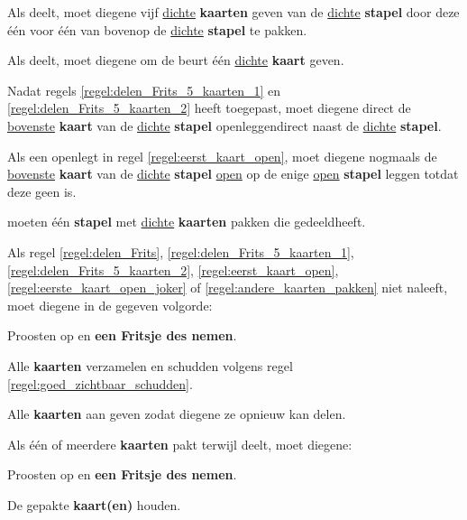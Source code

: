 \vervolgLijst{}
\item Als \Frits deelt\footnotemark[1], moet diegene \alleSpelers vijf \ul{dichte} \textbf{kaarten} geven van de \ul{dichte} \textbf{stapel} door deze één voor één van bovenop de \ul{dichte} \textbf{stapel} te pakken.
\label{regel:delen_Frits_5_kaarten_1}
\eindLijst{}

\vervolgLijst{}
\item Als \Frits deelt\footnotemark[1], moet diegene \alleSpelers om de beurt één \ul{dichte} \textbf{kaart} geven.
\label{regel:delen_Frits_5_kaarten_2}
\eindLijst{}

\vervolgLijst{}
\item Nadat \Frits regels \ref{regel:delen_Frits_5_kaarten_1} en \ref{regel:delen_Frits_5_kaarten_2} heeft toegepast, moet diegene direct de \ul{bovenste} \textbf{kaart} van de \ul{dichte} \textbf{stapel} openleggen\footnotemark[2] direct naast de \ul{dichte} \textbf{stapel}.
\label{regel:eerst_kaart_open}
\eindLijst{}

\vervolgLijst{}
\item Als \Frits een \footnotemark[3] openlegt in regel \ref{regel:eerst_kaart_open}, moet diegene nogmaals de \ul{bovenste} \textbf{kaart} van de \ul{dichte} \textbf{stapel} \ul{open} op de enige \ul{open} \textbf{stapel} leggen totdat deze geen \footnotemark[3] is.
\label{regel:eerste_kaart_open_joker}
\eindLijst{}

\vervolgLijst{}
\item \AlleSpelers moeten \'e\'en \textbf{stapel} met \ul{dichte} \textbf{kaarten} pakken die \Frits gedeeld\footnotemark[1] heeft.
\label{regel:andere_kaarten_pakken}
\eindLijst{}

\vervolgLijst{}
\item Als \eenSpeler regel \ref{regel:delen_Frits}, \ref{regel:delen_Frits_5_kaarten_1}, \ref{regel:delen_Frits_5_kaarten_2}, \ref{regel:eerst_kaart_open}, \ref{regel:eerste_kaart_open_joker} of \ref{regel:andere_kaarten_pakken} niet naleeft, moet diegene in de gegeven volgorde:
\puntLijst{}
\item Proosten op  en \textbf{een Fritsje des nemen}\footnotemark[4].
\item Alle \textbf{kaarten} verzamelen en schudden volgens regel \ref{regel:goed_zichtbaar_schudden}.
\item Alle \textbf{kaarten} aan \Frits geven zodat diegene ze opnieuw kan delen.
\eindPuntLijst{}
\eindLijst{}

\vervolgLijst{}
\item Als \eenSpeler \'e\'en of meerdere \textbf{kaarten} pakt terwijl \Frits deelt\footnotemark[1], moet diegene:
\puntLijst{}
\item Proosten op  en \textbf{een Fritsje des nemen}\footnotemark[4].
\item De gepakte \textbf{kaart(en)} houden.
\eindPuntLijst{}
\eindLijst{}

